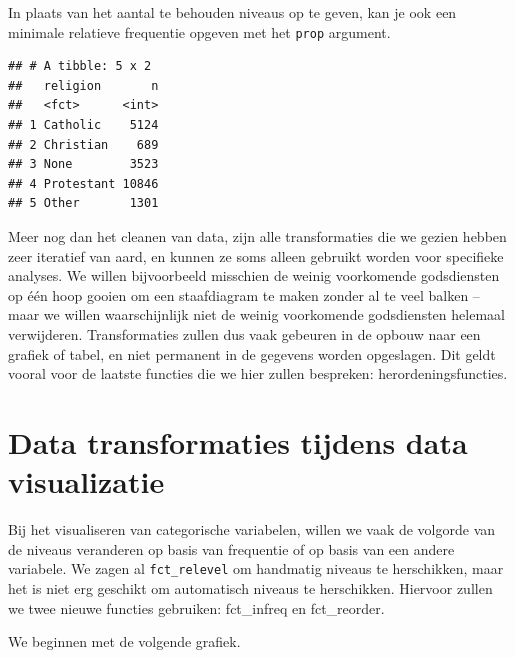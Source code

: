 \documentclass[]{tufte-book}
\newenvironment{Shaded}{}{}
\newcommand{\DataTypeTok}[1]{\textcolor[rgb]{0.56,0.13,0.00}{#1}}
\newcommand{\FloatTok}[1]{\textcolor[rgb]{0.25,0.63,0.44}{#1}}
\newcommand{\KeywordTok}[1]{\textcolor[rgb]{0.00,0.44,0.13}{\textbf{#1}}}
\newcommand{\NormalTok}[1]{#1}
\newcommand{\OperatorTok}[1]{\textcolor[rgb]{0.40,0.40,0.40}{#1}}
\newcommand{\StringTok}[1]{\textcolor[rgb]{0.25,0.44,0.63}{#1}}
\begin{document}
In plaats van het aantal te behouden niveaus op te geven, kan je ook een minimale relatieve frequentie opgeven met het \texttt{prop} argument.

\begin{Shaded}
\end{Shaded}

\begin{verbatim}
## # A tibble: 5 x 2
##   religion       n
##   <fct>      <int>
## 1 Catholic    5124
## 2 Christian    689
## 3 None        3523
## 4 Protestant 10846
## 5 Other       1301
\end{verbatim}

Meer nog dan het cleanen van data, zijn alle transformaties die we gezien hebben zeer iteratief van aard, en kunnen ze soms alleen gebruikt worden voor specifieke analyses. We willen bijvoorbeeld misschien de weinig voorkomende godsdiensten op één hoop gooien om een staafdiagram te maken zonder al te veel balken -- maar we willen waarschijnlijk niet de weinig voorkomende godsdiensten helemaal verwijderen. Transformaties zullen dus vaak gebeuren in de opbouw naar een grafiek of tabel, en niet permanent in de gegevens worden opgeslagen. Dit geldt vooral voor de laatste functies die we hier zullen bespreken: herordeningsfuncties.

\hypertarget{data-transformaties-tijdens-data-visualizatie}{%
\section{Data transformaties tijdens data visualizatie}\label{data-transformaties-tijdens-data-visualizatie}}

Bij het visualiseren van categorische variabelen, willen we vaak de volgorde van de niveaus veranderen op basis van frequentie of op basis van een andere variabele. We zagen al \texttt{fct\_relevel} om handmatig niveaus te herschikken, maar het is niet erg geschikt om automatisch niveaus te herschikken. Hiervoor zullen we twee nieuwe functies gebruiken: fct\_infreq en fct\_reorder.

We beginnen met de volgende grafiek.
\end{document}

